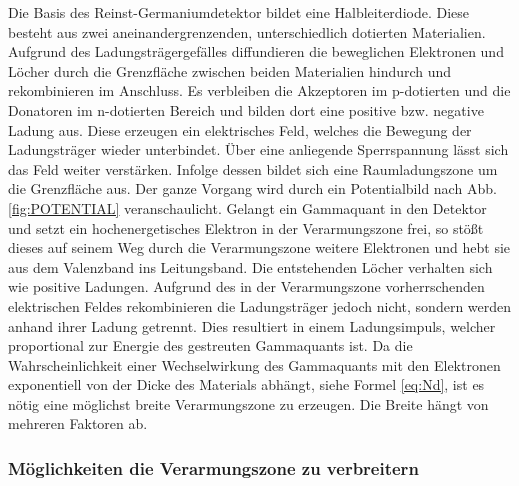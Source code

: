 Die Basis des Reinst-Germaniumdetektor bildet eine Halbleiterdiode. Diese besteht aus zwei aneinandergrenzenden, unterschiedlich dotierten Materialien. Aufgrund des Ladungsträgergefälles diffundieren die beweglichen Elektronen und Löcher durch die Grenzfläche zwischen beiden Materialien hindurch und rekombinieren im Anschluss. Es verbleiben die Akzeptoren im p-dotierten und die Donatoren im n-dotierten Bereich und bilden dort eine positive bzw. negative Ladung aus. Diese erzeugen ein elektrisches Feld, welches die Bewegung der Ladungsträger wieder unterbindet. Über eine anliegende Sperrspannung lässt sich das Feld weiter verstärken. Infolge dessen bildet sich eine Raumladungszone um die Grenzfläche aus. Der ganze Vorgang wird durch ein Potentialbild nach Abb. \ref{fig:POTENTIAL} veranschaulicht. Gelangt ein Gammaquant in den Detektor und setzt ein hochenergetisches Elektron in der Verarmungszone frei, so stößt dieses auf seinem Weg durch die Verarmungszone weitere Elektronen und hebt sie aus dem Valenzband ins Leitungsband. Die entstehenden Löcher verhalten sich wie positive Ladungen. Aufgrund des in der Verarmungszone vorherrschenden elektrischen Feldes rekombinieren die Ladungsträger jedoch nicht, sondern werden anhand ihrer Ladung getrennt. Dies resultiert in einem Ladungsimpuls, welcher proportional zur Energie des gestreuten Gammaquants ist. %
Da die Wahrscheinlichkeit einer Wechselwirkung des Gammaquants mit den Elektronen exponentiell von der Dicke des Materials abhängt, siehe Formel \eqref{eq:Nd}, ist es nötig eine möglichst breite Verarmungszone zu erzeugen. Die Breite hängt von mehreren Faktoren ab.

\subsubsection{Möglichkeiten die Verarmungszone zu verbreitern}

